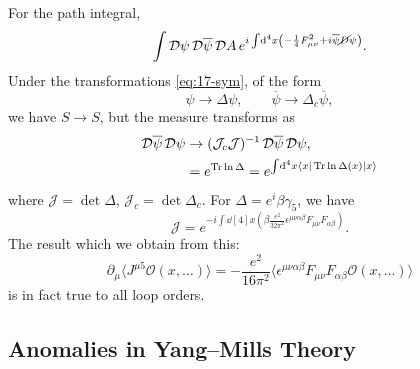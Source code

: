 For the path integral,
\begin{equation}
  \int \mathop{\mathcal{D} \psi} \mathop{\mathcal{D} \overline{\psi}{}} \mathop{\mathcal{D} A} e^{i \int \dd[4]{x} \left( -\frac{1}{4} F_{\mu\nu}^2 + i \overline{\psi}{} \cancel{D} \psi \right)}.
\end{equation}
Under the transformations \eqref{eq:17-sym}, of the form
\begin{equation}
  \psi \to \Delta \psi, \qquad \overline{\psi}{} \to \Delta_c \overline{\psi}{},
\end{equation}
we have $S \to S$, but the measure transforms as
\begin{align}
  \mathop{\mathcal{D} \overline{\psi}{}} \mathop{\mathcal{D} \psi} &\to (\mathcal{J}_c \mathcal{J})^{-1} \mathop{\mathcal{D} \overline{\psi}{}} \mathop{\mathcal{D} \psi}, \\
				     &= e^{\Tr \ln \Delta} = e^{\int \dd[4]{x} \bra{x} \Tr \ln \Delta (x) \ket{x}}
\end{align}
where $\mathcal{J} = \det \Delta$, $\mathcal{J}_c = \det \Delta_c$.
For $\Delta = e ^ i \beta \gamma_5$, we have
\begin{equation}
  \mathcal{J} = e^{-i \int \dd[4]{x} \left( \beta \frac{e^{2}}{32 \pi^2} \epsilon^{\mu\nu\alpha\beta} F_{\mu\nu} F_{\alpha\beta} \right)}.
\end{equation}
The result which we obtain from this:
\begin{equation}
  \partial_{\mu} \langle J^{\mu 5} \mathcal{O}(x, \dots) \rangle = -\frac{e^2}{16 \pi^2} \langle \epsilon^{\mu\nu\alpha\beta} F_{\mu\nu} F_{\alpha\beta} \mathcal{O}(x, \dots) \rangle
\end{equation}
is in fact true to all loop orders.

\subsection{Anomalies in Yang--Mills Theory}%
\label{sub:anomalies_in_yang_mills_theory}

